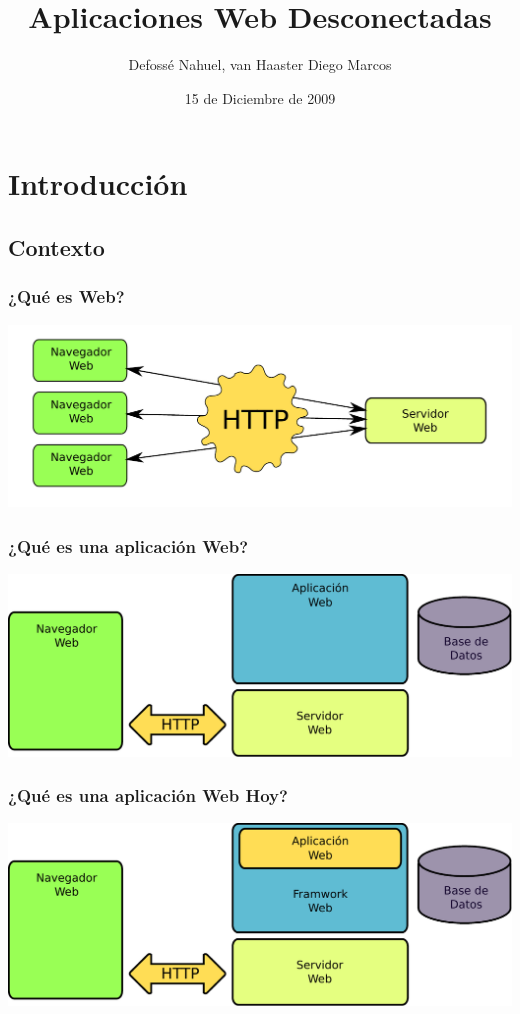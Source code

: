 \documentclass{beamer}
\begin{document}
\title{Aplicaciones Web Desconectadas}
\author{Defossé Nahuel, van Haaster Diego Marcos}
\date{15 de Diciembre de 2009}

\begin{frame}
\titlepage
\end{frame}

\section{Introducción}
\subsection{Contexto}

\begin{frame}
    \frametitle{¿Qué es Web?}
    \includegraphics[scale=0.5]{intro.pdf}
\end{frame}
    

\begin{frame}
    \frametitle{¿Qué es una aplicación Web?}
    \includegraphics[scale=0.5]{general.pdf}
\end{frame}

\begin{frame}
    \frametitle{¿Qué es una aplicación Web Hoy?}
    \includegraphics[scale=0.5]{general_con_fw.pdf}
\end{frame}
\end{document}
